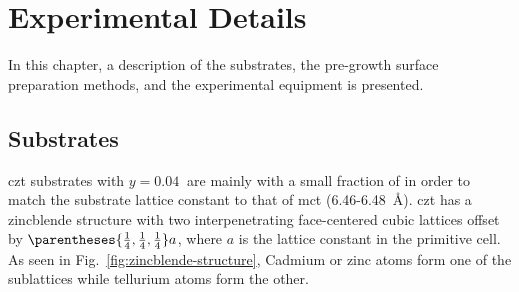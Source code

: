 
\chapter{Experimental Details}\label{ch:exp-details}
In this chapter, a description of the substrates, the pre-growth surface preparation methods, and the experimental equipment is presented.
\section{ Substrates}

\acl{czt} substrates with $y=\SI{0.04}{}$ are mainly  with a small fraction of  in order to match the substrate lattice constant to that of \acl{mct} (\SI{6.46}{}-\SI{6.48}{\angstrom}). \Ac{czt} has a zincblende structure with two interpenetrating face-centered cubic lattices offset by $\parentheses{\frac{1}{4},\frac{1}{4},\frac{1}{4}}a$, where $a$ is the lattice constant in the primitive cell. As seen in Fig.~\ref{fig:zincblende-structure}, Cadmium or zinc atoms form one of the sublattices while tellurium atoms form the other.

